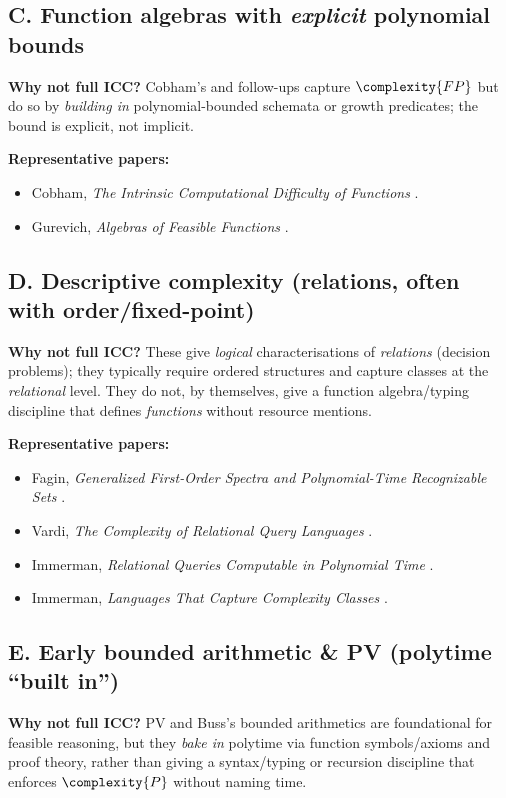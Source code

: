 \subsection*{C. Function algebras with \emph{explicit} polynomial bounds}
\textbf{Why not full ICC?} Cobham's and follow-ups capture \(\complexity{FP}\) but do so by \emph{building in}
polynomial-bounded schemata or growth predicates; the bound is explicit, not implicit.

\noindent\textbf{Representative papers:}
\begin{itemize}
  \item Cobham, \emph{The Intrinsic Computational Difficulty of Functions} \cite{Cobham1964}.
  \item Gurevich, \emph{Algebras of Feasible Functions} \cite{Gurevich1983}.
\end{itemize}

\subsection*{D. Descriptive complexity (relations, often with order/fixed-point)}
\textbf{Why not full ICC?} These give \emph{logical} characterisations of \emph{relations} (decision problems);
they typically require ordered structures and capture classes at the \emph{relational} level.
They do not, by themselves, give a function algebra/typing discipline that defines
\emph{functions} without resource mentions.

\noindent\textbf{Representative papers:}
\begin{itemize}
  \item Fagin, \emph{Generalized First-Order Spectra and Polynomial-Time Recognizable Sets} \cite{Fagin1974}.
  \item Vardi, \emph{The Complexity of Relational Query Languages} \cite{Vardi1982}.
  \item Immerman, \emph{Relational Queries Computable in Polynomial Time} \cite{Immerman1986}.
  \item Immerman, \emph{Languages That Capture Complexity Classes} \cite{Immerman1987}.
\end{itemize}

\subsection*{E. Early bounded arithmetic \& PV (polytime ``built in'')}
\textbf{Why not full ICC?} PV and Buss's bounded arithmetics are foundational for feasible
reasoning, but they \emph{bake in} polytime via function symbols/axioms and proof theory,
rather than giving a syntax/typing or recursion discipline that enforces \(\complexity{P}\) without
naming time.

